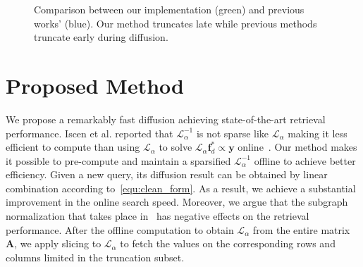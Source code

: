 \documentclass[letterpaper]{article} \usepackage{aaai19}  \usepackage{times}  \usepackage{helvet}  \usepackage{courier}  \usepackage{url}  \usepackage{graphicx}  \frenchspacing  \setlength{\pdfpagewidth}{8.5in}  \setlength{\pdfpageheight}{11in}
\begin{document}
\begin{figure}[t]
\centering
{}
\caption{Comparison between our implementation (green) and previous works' (blue). Our method truncates late while previous methods truncate early during diffusion.}
\label{fig:trunc_order}
\vspace{-3mm}
\end{figure}


\section{Proposed Method}

We propose a remarkably fast diffusion achieving state-of-the-art retrieval performance.
Iscen et al. reported that $\mathcal{L}_\alpha^{-1}$ is not sparse like $\mathcal{L}_\alpha$ making it less efficient to compute than using $\mathcal{L}_\alpha$ to solve $\mathcal{L}_\alpha \mathbf{f}_d^*\propto \mathbf{y}$ online~\cite{iscen2017efficient}.
Our method makes it possible to pre-compute and maintain a sparsified $\mathcal{L}_\alpha^{-1}$ offline to achieve better efficiency.
Given a new query, its diffusion result can be obtained by linear combination according to~\cref{equ:clean_form}.
As a result, we achieve a substantial improvement in the online search speed.
Moreover, we argue that the subgraph normalization that takes place in~\cite{iscen2017efficient} has negative effects on the retrieval performance.
After the offline computation to obtain $\mathcal{L}_\alpha$ from the entire matrix $\mathbf{A}$, we apply slicing to $\mathcal{L}_\alpha$ to fetch the values on the corresponding rows and columns limited in the truncation subset.
\end{document}
